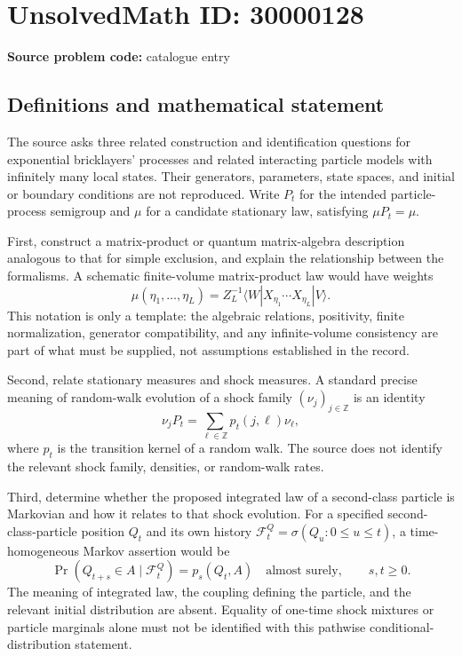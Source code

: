 \documentclass[11pt]{article}
\newcommand{\Z}{\mathbb{Z}}
\begin{document}
\section*{UnsolvedMath ID: 30000128}
\textbf{Source problem code:} catalogue entry
\subsection{Definitions and mathematical statement}
The source asks three related construction and identification questions for exponential bricklayers' processes and related interacting particle models with infinitely many local states. Their generators, parameters, state spaces, and initial or boundary conditions are not reproduced. Write \(P_t\) for the intended particle-process semigroup and \(\mu\) for a candidate stationary law, satisfying \(\mu P_t=\mu\).

First, construct a matrix-product or quantum matrix-algebra description analogous to that for simple exclusion, and explain the relationship between the formalisms. A schematic finite-volume matrix-product law would have weights
\[
\mu(\eta_1,\ldots,\eta_L)=Z_L^{-1}\langle W|X_{\eta_1}\cdots X_{\eta_L}|V\rangle.
\]
This notation is only a template: the algebraic relations, positivity, finite normalization, generator compatibility, and any infinite-volume consistency are part of what must be supplied, not assumptions established in the record.

Second, relate stationary measures and shock measures. A standard precise meaning of random-walk evolution of a shock family \((\nu_j)_{j\in\Z}\) is an identity
\[
\nu_jP_t=\sum_{\ell\in\Z}p_t(j,\ell)\nu_\ell,
\]
where \(p_t\) is the transition kernel of a random walk. The source does not identify the relevant shock family, densities, or random-walk rates.

Third, determine whether the proposed integrated law of a second-class particle is Markovian and how it relates to that shock evolution. For a specified second-class-particle position \(Q_t\) and its own history \(\mathcal F_t^Q=\sigma(Q_u:0\leq u\leq t)\), a time-homogeneous Markov assertion would be
\[
\Pr(Q_{t+s}\in A\mid\mathcal F_t^Q)=p_s(Q_t,A)
\quad\text{almost surely},\qquad s,t\geq0.
\]
The meaning of integrated law, the coupling defining the particle, and the relevant initial distribution are absent. Equality of one-time shock mixtures or particle marginals alone must not be identified with this pathwise conditional-distribution statement.
\end{document}
